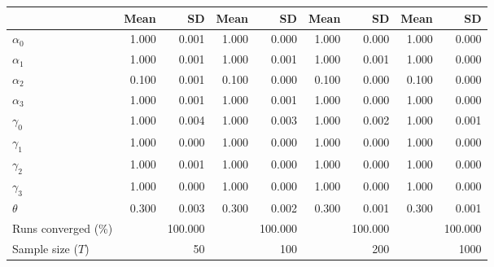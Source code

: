 
\begin{tabular}[t]{lrrrrrrrr}
\toprule
  & Mean & SD & Mean  & SD  & Mean   & SD   & Mean    & SD   \\
\midrule
$\alpha_{0}$ & 1.000 & 0.001 & 1.000 & 0.000 & 1.000 & 0.000 & 1.000 & 0.000\\
$\alpha_{1}$ & 1.000 & 0.001 & 1.000 & 0.001 & 1.000 & 0.001 & 1.000 & 0.000\\
$\alpha_{2}$ & 0.100 & 0.001 & 0.100 & 0.000 & 0.100 & 0.000 & 0.100 & 0.000\\
$\alpha_{3}$ & 1.000 & 0.001 & 1.000 & 0.001 & 1.000 & 0.000 & 1.000 & 0.000\\
$\gamma_{0}$ & 1.000 & 0.004 & 1.000 & 0.003 & 1.000 & 0.002 & 1.000 & 0.001\\
$\gamma_{1}$ & 1.000 & 0.000 & 1.000 & 0.000 & 1.000 & 0.000 & 1.000 & 0.000\\
$\gamma_{2}$ & 1.000 & 0.001 & 1.000 & 0.000 & 1.000 & 0.000 & 1.000 & 0.000\\
$\gamma_{3}$ & 1.000 & 0.000 & 1.000 & 0.000 & 1.000 & 0.000 & 1.000 & 0.000\\
$\theta$ & 0.300 & 0.003 & 0.300 & 0.002 & 0.300 & 0.001 & 0.300 & 0.001\\
Runs converged (\%) &  & 100.000 &  & 100.000 &  & 100.000 &  & 100.000\\
Sample size ($T$) &  & 50 &  & 100 &  & 200 &  & 1000\\
\bottomrule
\end{tabular}
